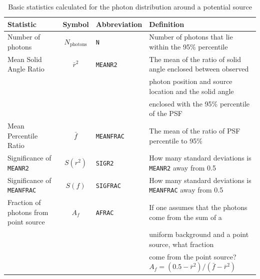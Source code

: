 \documentclass[useAMS,usenatbib]{mn2e}
\begin{document}
\begin{table}
  \caption{Basic statistics calculated for the photon distribution around a potential source}
  \label{tab:stats}
  \begin{tabular}{l|cll}
    \hline
    Statistic & Symbol & Abbreviation & Definition \\
    \hline
    Number of photons                     &  $N_\mathrm{photons}$ & \texttt{N}        & Number of photons that lie within the 95\% percentile \\
    Mean Solid Angle Ratio                &  $\bar r^2$          & \texttt{MEANR2}   & The mean of the ratio of solid angle enclosed between observed \\
                                          &                      &                   & photon position and source location and the solid angle \\
                                          &                      &                   & enclosed with the 95\% percentile of the PSF \\
    Mean Percentile Ratio                 &  $\bar f$            & \texttt{MEANFRAC} & The mean of the ratio of PSF percentile to 95\% \\
    Significance of \texttt{MEANR2}       & $S(r^2)$             & \texttt{SIGR2}    & How many standard deviations is \texttt{MEANR2} away from 0.5 \\
    Significance of \texttt{MEANFRAC}     & $S(f)$               & \texttt{SIGFRAC}  & How many standard deviations is \texttt{MEANFRAC} away from 0.5 \\
    Fraction of photons from point source & $A_f$                & \texttt{AFRAC}    & If one assumes that the photons come from the sum of a  \\
                                          &                      &                   & uniform background and a point source, what fraction \\
                                          &                      &                   & come from the point source? $A_f=(0.5-\bar r^2)/(\bar f-\bar r^2)$ \\
  \end{tabular}
\end{table}
\end{document}
